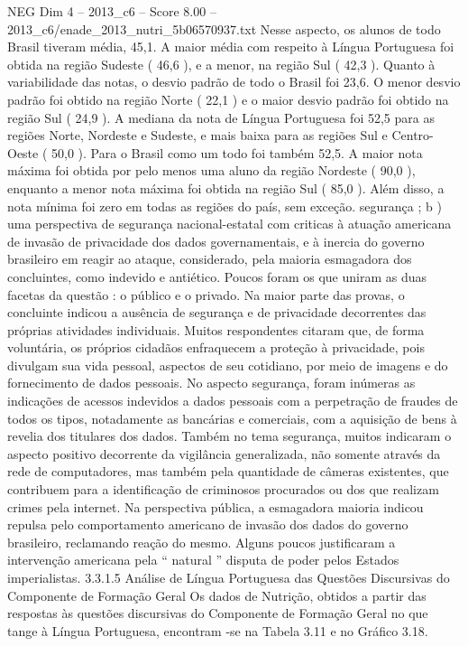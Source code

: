 \begin{textsample}{NEG Dim 4 – 2013\_c6 – Score 8.00 – 2013\_c6/enade\_2013\_nutri\_5b06570937.txt}
Nesse aspecto, os alunos de todo Brasil tiveram média, 45,1.
A maior média com respeito à Língua Portuguesa foi obtida na região Sudeste ( 46,6 ), e a menor, na região Sul ( 42,3 ).
Quanto à variabilidade das notas, o desvio padrão de todo o Brasil foi 23,6.
O menor desvio padrão foi obtido na região Norte ( 22,1 ) e o maior desvio padrão foi obtido na região Sul ( 24,9 ).
A mediana da nota de Língua Portuguesa foi 52,5 para as regiões Norte, Nordeste e Sudeste, e mais baixa para as regiões Sul e Centro-Oeste ( 50,0 ).
Para o Brasil como um todo foi também 52,5.
A maior nota máxima foi obtida por pelo menos uma aluno da região Nordeste ( 90,0 ), enquanto a menor nota máxima foi obtida na região Sul ( 85,0 ).
Além disso, a nota mínima foi zero em todas as regiões do país, sem exceção. segurança ; b ) uma perspectiva de segurança nacional-estatal com criticas à atuação americana de invasão de privacidade dos dados governamentais, e à inercia do governo brasileiro em reagir ao ataque, considerado, pela maioria esmagadora dos concluintes, como indevido e antiético.
Poucos foram os que uniram as duas facetas da questão : o público e o privado.
Na maior parte das provas, o concluinte indicou a ausência de segurança e de privacidade decorrentes das próprias atividades individuais.
Muitos respondentes citaram que, de forma voluntária, os próprios cidadãos enfraquecem a proteção à privacidade, pois divulgam sua vida pessoal, aspectos de seu cotidiano, por meio de imagens e do fornecimento de dados pessoais.
No aspecto segurança, foram inúmeras as indicações de acessos indevidos a dados pessoais com a perpetração de fraudes de todos os tipos, notadamente as bancárias e comerciais, com a aquisição de bens à revelia dos titulares dos dados.
Também no tema segurança, muitos indicaram o aspecto positivo decorrente da vigilância generalizada, não somente através da rede de computadores, mas também pela quantidade de câmeras existentes, que contribuem para a identificação de criminosos procurados ou dos que realizam crimes pela internet.
Na perspectiva pública, a esmagadora maioria indicou repulsa pelo comportamento americano de invasão dos dados do governo brasileiro, reclamando reação do mesmo.
Alguns poucos justificaram a intervenção americana pela “ natural ” disputa de poder pelos Estados imperialistas. 3.3.1.5 Análise de Língua Portuguesa das Questões Discursivas do Componente de Formação Geral Os dados de Nutrição, obtidos a partir das respostas às questões discursivas do Componente de Formação Geral no que tange à Língua Portuguesa, encontram -se na Tabela 3.11 e no Gráfico 3.18.

\end{textsample}
